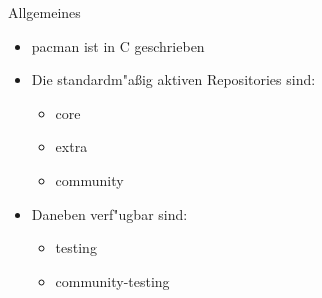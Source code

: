 
\begin{slide}{Allgemeines}
	\begin{itemize}
		\item{pacman ist in C geschrieben}
		\item{Die standardm"{a}ßig aktiven Repositories sind:
			\begin{itemize}
				\item{core}
				\item{extra}
				\item{community}
			\end{itemize}
		}
		\item{Daneben verf"{u}gbar sind:
			\begin{itemize}
				\item{testing}
				\item{community-testing}
			\end{itemize}
		}
	\end{itemize}
\end{slide}

